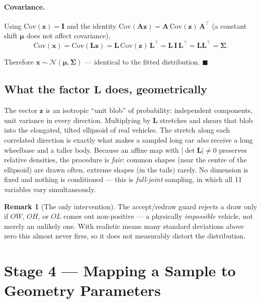 \documentclass[11pt]{article}
\newcommand{\OL}{\mathit{OL}}
\newcommand{\OW}{\mathit{OW}}
\newcommand{\OH}{\mathit{OH}}
\newcommand{\Norm}{\mathcal{N}}
\newcommand{\bmu}{\boldsymbol{\mu}}
\newcommand{\bSigma}{\boldsymbol{\Sigma}}
\newcommand{\bx}{\mathbf{x}}
\newcommand{\bz}{\mathbf{z}}
\newcommand{\Lmat}{\mathbf{L}}
\newcommand{\Imat}{\mathbf{I}}
\newcommand{\T}{^{\!\top}}
\theoremstyle{definition}
\newtheorem{remark}{Remark}
\begin{document}
\paragraph{Covariance.} Using $\mathrm{Cov}(\bz)=\Imat$ and the identity $\mathrm{Cov}(\mathbf{A}\bz)=\mathbf{A}\,\mathrm{Cov}(\bz)\,\mathbf{A}\T$ (a constant shift $\bmu$ does not affect covariance),
\begin{equation}
\mathrm{Cov}(\bx)=\mathrm{Cov}(\Lmat\bz)=\Lmat\,\mathrm{Cov}(\bz)\,\Lmat\T=\Lmat\,\Imat\,\Lmat\T=\Lmat\Lmat\T=\bSigma.
\end{equation}

\noindent Therefore $\bx\sim\Norm(\bmu,\bSigma)$ --- identical to the fitted distribution. \hfill$\blacksquare$

\subsection{What the factor \texorpdfstring{$\Lmat$}{L} does, geometrically}

The vector $\bz$ is an isotropic ``unit blob'' of probability: independent components, unit variance in every direction. Multiplying by $\Lmat$ stretches and shears that blob into the elongated, tilted ellipsoid of real vehicles. The stretch along each correlated direction is exactly what makes a sampled long car \emph{also} receive a long wheelbase and a taller body. Because an affine map with $|\det\Lmat|\neq0$ preserves relative densities, the procedure is \emph{fair}: common shapes (near the centre of the ellipsoid) are drawn often, extreme shapes (in the tails) rarely. No dimension is fixed and nothing is conditioned --- this is \emph{full-joint} sampling, in which all 11 variables vary simultaneously.

\begin{remark}[The only intervention]
The accept/redraw guard rejects a draw only if $\OW$, $\OH$, or $\OL$ comes out non-positive --- a physically \emph{impossible} vehicle, not merely an unlikely one. With realistic means many standard deviations above zero this almost never fires, so it does not measurably distort the distribution.
\end{remark}

\section{Stage 4 --- Mapping a Sample to Geometry Parameters}
\end{document}
